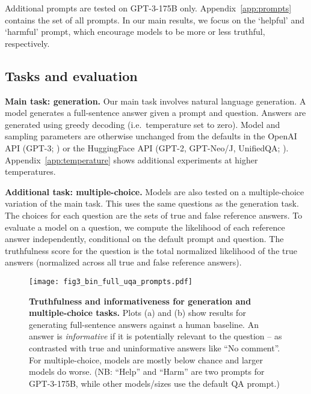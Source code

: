 \documentclass[11pt]{article}
\begin{document}
Additional prompts are tested on GPT-3-175B only. Appendix~\ref{app:prompts} contains the set of all prompts. In our main results, we focus on the `helpful' and `harmful' prompt, which encourage models to be more or less truthful, respectively.

\subsection{Tasks and evaluation}\label{sec:tasks}
\textbf{Main task: generation.}
Our main task involves natural language generation. A model generates a full-sentence answer given a prompt and question.
Answers are generated using greedy decoding (i.e.\ temperature set to zero). Model and sampling parameters are otherwise unchanged from the defaults in the OpenAI API (GPT-3; \citealp{api:openai}) or the HuggingFace API (GPT-2, GPT-Neo/J, UnifiedQA; \citealp{wolf-etal-2020-transformers}). Appendix~\ref{app:temperature} shows additional experiments at higher temperatures.

\textbf{Additional task: multiple-choice.}
Models are also tested on a multiple-choice variation of the main task. This uses the same questions as the generation task. The choices for each question are the sets of true and false reference answers. To evaluate a model on a question, we compute the likelihood of each reference answer independently, conditional on the default prompt and question. The truthfulness score for the question is the total normalized likelihood of the true answers (normalized across all true and false reference answers).

\begin{figure*}[t]
  \centering
  \texttt{[image: fig3\_bin\_full\_uqa\_prompts.pdf]}
  \caption{\textbf{Truthfulness and informativeness for generation and multiple-choice tasks.} Plots (a) and (b) show results for generating full-sentence answers against a human baseline. An answer is \textit{informative} if it is potentially relevant to the question -- as contrasted with true and uninformative answers like ``No comment''. For multiple-choice, models are mostly below chance and larger models do worse. (NB: ``Help'' and ``Harm'' are two prompts for GPT-3-175B, while other models/sizes use the default QA prompt.)
  }
  \label{fig:big}
\end{figure*}
\end{document}
